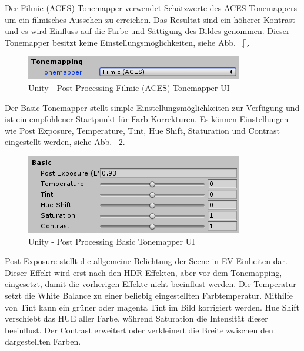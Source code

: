 Der Filmic (ACES) Tonemapper verwendet Schätzwerte  des ACES Tonemappers um ein filmisches Aussehen zu erreichen.
Das Resultat sind ein höherer Kontrast und es wird Einfluss auf die Farbe und Sättigung des Bildes genommen.
Dieser Tonemapper besitzt keine Einstellungsmöglichkeiten, siehe Abb. ~\ref{}.
\begin {figure}
    \centering
    \includegraphics[scale=0.9]{pics/unity-post-processing-color-grading-filmic}
    \caption{Unity - Post Processing Filmic (ACES) Tonemapper UI}
    \label{fig:unity-post-processing-filmic-aces-tonemapper-ui}
\end {figure}

Der Basic Tonemapper stellt simple Einstellungsmöglichkeiten zur Verfügung und ist ein empfohlener Startpunkt für Farb Korrekturen.
Es können Einstellungen wie Post Exposure, Temperature, Tint, Hue Shift, Staturation und Contrast eingestellt werden, siehe Abb. ~\ref{fig:unity-post-processing-basic-tonemapper-ui}.
\begin {figure}
    \centering
    \includegraphics[scale=0.9]{pics/unity-post-processing-color-grading-basicTonemapper}
    \caption{Unity - Post Processing Basic Tonemapper UI}
    \label{fig:unity-post-processing-basic-tonemapper-ui}
\end {figure}

Post Exposure stellt die allgemeine Belichtung der Scene in EV Einheiten dar.
Dieser Effekt wird erst nach den HDR Effekten, aber vor dem Tonemapping, eingesetzt, damit die vorherigen Effekte nicht beeinflust werden.
Die Temperatur setzt die White Balance zu einer beliebig eingestellten Farbtemperatur.
Mithilfe von Tint kann ein grüner oder magenta Tint im Bild korrigiert werden.
Hue Shift verschiebt das HUE aller Farbe, während Saturation die Intensität dieser beeinflust.
Der Contrast erweitert oder verkleinert die Breite zwischen den dargestellten Farben.


